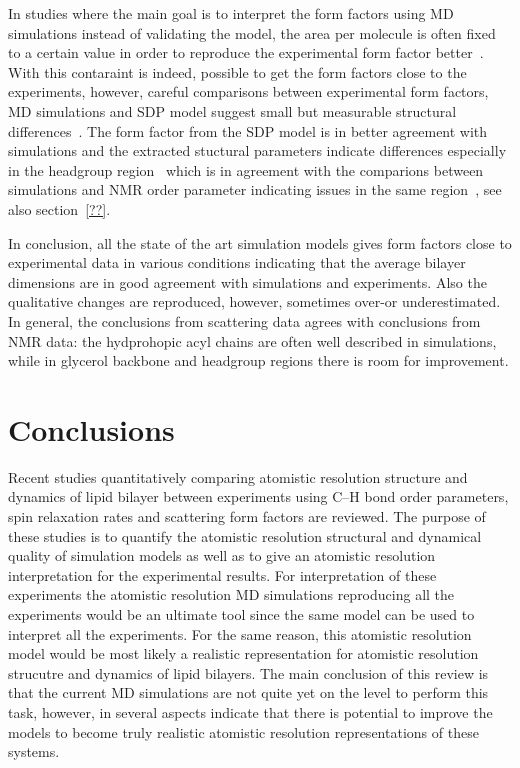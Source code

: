 \documentclass[aps,prl,superscriptaddress,twocolumn]{revtex4}
\begin{document}
In studies where the main goal is to interpret the form factors using MD simulations instead of validating the model,
the area per molecule is often fixed to a certain value in order to reproduce the experimental form factor 
better~\cite{sachs03,klauda06,kucerka08a,kucerka08b,braun13}.
With this contaraint is indeed, possible to get the form factors close to the experiments, however, 
careful comparisons between experimental form factors, MD simulations and SDP model suggest small but measurable 
structural differences~\cite{kucerka08a,braun13}. The form factor from the SDP model is in better agreement
with simulations and the extracted stuctural parameters indicate differences especially in the headgroup region~\cite{kucerka08a,braun13} 
which is in agreement with the comparions between simulations and NMR order parameter indicating issues in the same region~\cite{botan15}, 
see also section~\ref{??}.

In conclusion, all the state of the art simulation models gives form factors close to experimental
data in various conditions indicating that the average bilayer dimensions are in good agreement with simulations
and experiments. Also the qualitative changes are reproduced, however, sometimes over-or underestimated.
In general, the conclusions from scattering data agrees with conclusions from NMR data:
the hydprohopic acyl chains are often well described in simulations, while in glycerol backbone and headgroup 
regions there is room for improvement.

\onecolumngrid
{}
\twocolumngrid


\section{Conclusions}

Recent studies quantitatively comparing atomistic resolution structure and dynamics of lipid
bilayer between experiments using C--H bond order parameters, spin relaxation rates and
scattering form factors are reviewed. The purpose of these studies is to quantify the atomistic
resolution structural and dynamical quality of simulation models as well as to give an 
atomistic resolution interpretation for the experimental results. For interpretation of
these experiments the atomistic resolution MD simulations reproducing all the experiments would be
an ultimate tool since the same model can be used to interpret all the experiments. For the same 
reason, this atomistic resolution model would be most likely a realistic representation for
atomistic resolution strucutre and dynamics of lipid bilayers. The main conclusion of this
review is that the current MD simulations are not quite yet on the level to perform this task,
however, in several aspects indicate that there is potential to improve the models to become 
truly realistic atomistic resolution representations of these systems. 
\end{document}
